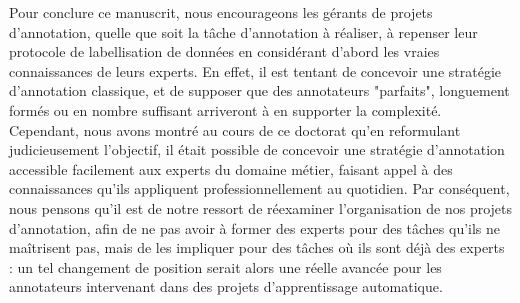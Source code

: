		Pour conclure ce manuscrit, nous encourageons les gérants de projets d'annotation, quelle que soit la tâche d'annotation à réaliser, à repenser leur protocole de labellisation de données en considérant d'abord les vraies connaissances de leurs experts.
		En effet, il est tentant de concevoir une stratégie d'annotation classique, et de supposer que des annotateurs "parfaits", longuement formés ou en nombre suffisant arriveront à en supporter la complexité.
		Cependant, nous avons montré au cours de ce doctorat qu'en reformulant judicieusement l'objectif, il était possible de concevoir une stratégie d'annotation accessible facilement aux experts du domaine métier, faisant appel à des connaissances qu'ils appliquent professionnellement au quotidien.
		Par conséquent, nous pensons qu'il est de notre ressort de réexaminer l'organisation de nos projets d'annotation, afin de ne pas avoir à former des experts pour des tâches qu'ils ne maîtrisent pas, mais de les impliquer pour des tâches où ils sont déjà des experts : un tel changement de position serait alors une réelle avancée pour les annotateurs intervenant dans des projets d'apprentissage automatique.